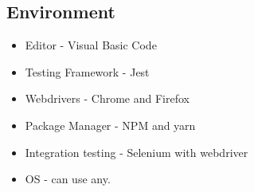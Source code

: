 \subsection{Environment}
\begin{itemize}
    \item Editor - Visual Basic Code
    \item Testing Framework - Jest
    \item Webdrivers - Chrome and Firefox
    \item Package Manager - NPM and yarn
    \item Integration testing - Selenium with webdriver
    \item OS - can use any.
\end{itemize}

